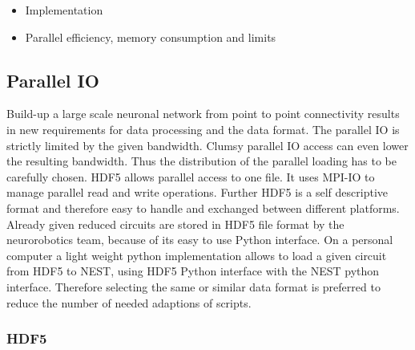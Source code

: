 \documentclass[a4paper]{article}
\begin{document}
\begin{itemize}
      \item Implementation
      \item Parallel efficiency, memory consumption and limits
   \end{itemize}

\subsection{Parallel IO}
Build-up a large scale neuronal network from point to point connectivity results in new requirements for data processing and the data format. The parallel IO is strictly limited by the given bandwidth. Clumsy parallel IO access can even lower the resulting bandwidth.
Thus the distribution of the parallel loading has to be carefully chosen. HDF5 allows parallel access to one file.
It uses MPI-IO to manage parallel read and write operations. Further HDF5 is a self descriptive format and therefore easy to handle
and exchanged between different platforms. Already given reduced circuits are stored in HDF5 file format by the neurorobotics team, 
because of its easy to use Python interface. On a personal computer a light weight python implementation allows to load a given
circuit from HDF5 to NEST, using HDF5 Python interface with the NEST python interface. Therefore selecting the same or similar data 
format is preferred to reduce the number of needed adaptions of scripts.


\subsubsection{HDF5}
\end{document}
